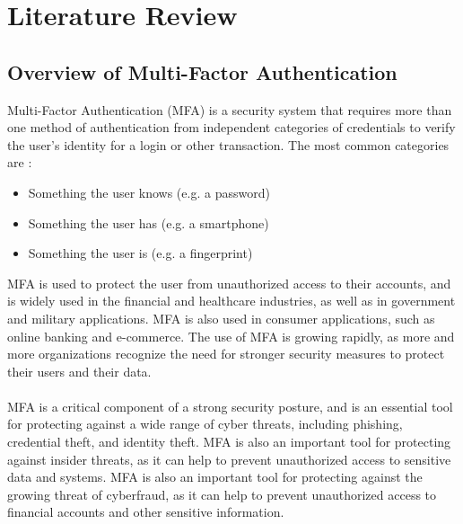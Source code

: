 \documentclass[12pt]{report}
\begin{document}
\newpage
\chapter{Literature Review}
\section{Overview of Multi-Factor Authentication}

Multi-Factor Authentication (MFA) is a security system that requires more than
one method of authentication from independent categories of credentials to verify
the user's identity for a login or other transaction. The most common
categories are \cite{mfa}:
\begin{itemize}
	\item Something the user knows (e.g. a password)

	\item Something the user has (e.g. a smartphone)

	\item Something the user is (e.g. a fingerprint)
\end{itemize}
MFA is used to protect the user from unauthorized access to their accounts,
and is widely used in the financial and healthcare industries, as well as in government
and military applications. MFA is also used in consumer applications, such as online
banking and e-commerce. The use of MFA is growing rapidly, as more and more organizations
recognize the need for stronger security measures to protect their users and their
data. \\ \\ MFA is a critical component of a strong security posture, and is an
essential tool for protecting against a wide range of cyber threats, including
phishing, credential theft, and identity theft. MFA is also an important tool for
protecting against insider threats, as it can help to prevent unauthorized
access to sensitive data and systems. MFA is also an important tool for protecting
against the growing threat of cyberfraud, as it can help to prevent
unauthorized access to financial accounts and other sensitive information. \\ \\
\end{document}
